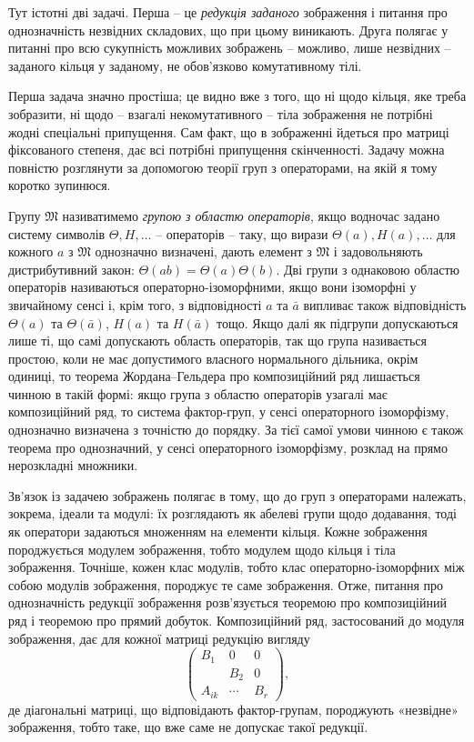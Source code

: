 \documentclass[11pt]{article}
\begin{document}
Тут істотні дві задачі. Перша -- це \emph{редукція заданого} зображення і питання про однозначність незвідних складових, що при цьому виникають. Друга полягає у питанні про всю сукупність можливих зображень -- можливо, лише незвідних -- заданого кільця у заданому, не обов'язково комутативному тілі.

Перша задача значно простіша; це видно вже з того, що ні щодо кільця, яке треба зобразити, ні щодо -- взагалі некомутативного -- тіла зображення не потрібні жодні спеціальні припущення. Сам факт, що в зображенні йдеться про матриці фіксованого степеня, дає всі потрібні припущення скінченності. Задачу можна повністю розглянути за допомогою теорії груп з операторами, на якій я тому коротко зупинюся.

Групу $\mathfrak{M}$ називатимемо \emph{групою з областю операторів}, якщо водночас задано систему символів $\Theta,H,\ldots$ -- операторів -- таку, що вирази $\Theta(a),H(a),\ldots$ для кожного $a$ з $\mathfrak{M}$ однозначно визначені, дають елемент з $\mathfrak{M}$ і задовольняють дистрибутивний закон: $\Theta(ab)=\Theta(a)\Theta(b)$. Дві групи з однаковою областю операторів називаються операторно-ізоморфними, якщо вони ізоморфні у звичайному сенсі і, крім того, з відповідності $a$ та $\bar a$ випливає також відповідність $\Theta(a)$ та $\Theta(\bar a)$, $H(a)$ та $H(\bar a)$ тощо. Якщо далі як підгрупи допускаються лише ті, що самі допускають область операторів, так що група називається простою, коли не має допустимого власного нормального дільника, окрім одиниці, то теорема Жордана--Гельдера про композиційний ряд лишається чинною в такій формі: якщо група з областю операторів узагалі має композиційний ряд, то система фактор-груп, у сенсі операторного ізоморфізму, однозначно визначена з точністю до порядку. За тієї самої умови чинною є також теорема про однозначний, у сенсі операторного ізоморфізму, розклад на прямо нерозкладні множники.

Зв'язок із задачею зображень полягає в тому, що до груп з операторами належать, зокрема, ідеали та модулі: їх розглядають як абелеві групи щодо додавання, тоді як оператори задаються множенням на елементи кільця. Кожне зображення породжується модулем зображення, тобто модулем щодо кільця і тіла зображення. Точніше, кожен клас модулів, тобто клас операторно-ізоморфних між собою модулів зображення, породжує те саме зображення. Отже, питання про однозначність редукції зображення розв'язується теоремою про композиційний ряд і теоремою про прямий добуток. Композиційний ряд, застосований до модуля зображення, дає для кожної матриці редукцію вигляду
\[
\begin{pmatrix}
B_1&0&0\\
&B_2&0\\
A_{ik}&\cdots&B_r
\end{pmatrix},
\]
де діагональні матриці, що відповідають фактор-групам, породжують «незвідне» зображення, тобто таке, що вже саме не допускає такої редукції.
\end{document}

